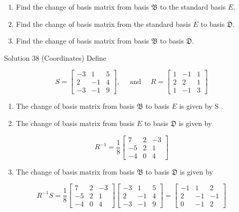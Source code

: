 \documentclass[10pt]{article}
\begin{document}
\begin{enumerate}
  \item Find the change of basis matrix from basis $\mathfrak{B}$ to the standard basis $E$.
  \item Find the change of basis matrix from the standard basis $E$ to basis $\mathfrak{D}$.
  \item Find the change of basis matrix from basis $\mathfrak{B}$ to basis $\mathfrak{D}$.
\end{enumerate}

Solution 38 (Coordinates) Define

$$
S=\left[\begin{array}{ccc}
-3 & 1 & 5 \\
2 & -1 & 4 \\
-3 & -1 & 9
\end{array}\right], \quad \text { and } \quad R=\left[\begin{array}{ccc}
1 & -1 & 1 \\
2 & 2 & 1 \\
1 & -1 & 3
\end{array}\right]
$$

\begin{enumerate}
  \item The change of basis matrix from basis $\mathfrak{B}$ to basis $E$ is given by S .
  \item The change of basis matrix from basis $E$ to basis $\mathfrak{D}$ is given by
\end{enumerate}

$$
R^{-1}=\frac{1}{8}\left[\begin{array}{ccc}
7 & 2 & -3 \\
-5 & 2 & 1 \\
-4 & 0 & 4
\end{array}\right]
$$

\begin{enumerate}
  \setcounter{enumi}{2}
  \item The change of basis matrix from basis $\mathfrak{B}$ to basis $\mathfrak{D}$ is given by
\end{enumerate}

$$
R^{-1} S=\frac{1}{8}\left[\begin{array}{ccc}
7 & 2 & -3 \\
-5 & 2 & 1 \\
-4 & 0 & 4
\end{array}\right]\left[\begin{array}{ccc}
-3 & 1 & 5 \\
2 & -1 & 4 \\
-3 & -1 & 9
\end{array}\right]=\left[\begin{array}{ccc}
-1 & 1 & 2 \\
2 & -1 & -1 \\
0 & -1 & 2
\end{array}\right]
$$
\end{document}
